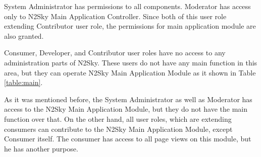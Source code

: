 System Administrator has permissions to all components. Moderator has access only to N2Sky Main Application Controller. Since both of this user role extending Contributor user role, the permissions for main application module are also granted.

Consumer, Developer, and Contributor user roles have no access to any administration parts of N2Sky. These users do not have any main function in this area, but they can operate N2Sky Main Application Module as it shown in Table \ref{table:main}.

\begin{table}[]
\caption{User Roles main functions considering "N2Sky Main Application Module". 
"+" for allowed, "-" for disallowed}
\label{table:main}
\end{table}

As it was mentioned before, the System Administrator as well as Moderator has access to the N2Sky Main Application Module, but they do not have the main function over that. On the other hand, all user roles, which are extending consumers can contribute to the N2Sky Main Application Module, except Consumer itself. The consumer has access to all page views on this module, but he has another purpose. 



